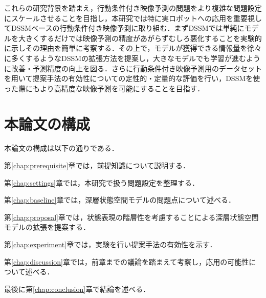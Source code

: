 これらの研究背景を踏まえ，行動条件付き映像予測の問題をより複雑な問題設定にスケールさせることを目指し，本研究では特に実ロボットへの応用を重要視してDSSMベースの行動条件付き映像予測に取り組む．まずDSSMでは単純にモデルを大きくするだけでは映像予測の精度があがらずむしろ悪化することを実験的に示しその理由を簡単に考察する．その上で，モデルが獲得できる情報量を徐々に多くするようなDSSMの拡張方法を提案し，大きなモデルでも学習が進むように改善・予測精度の向上を図る．さらに行動条件付き映像予測用のデータセットを用いて提案手法の有効性についての定性的・定量的な評価を行い，DSSMを使った際にもより高精度な映像予測を可能にすることを目指す．

\section{本論文の構成}

本論文の構成は以下の通りである．

第\ref{chap:prerequisite}章では，前提知識について説明する．

第\ref{chap:settings}章では，本研究で扱う問題設定を整理する．

第\ref{chap:baseline}章では，深層状態空間モデルの問題点について述べる．

第\ref{chap:proposal}章では，状態表現の階層性を考慮することによる深層状態空間モデルの拡張を提案する．

第\ref{chap:experiment}章では，実験を行い提案手法の有効性を示す．

第\ref{chap:discussion}章では，前章までの議論を踏まえて考察し，応用の可能性について述べる．

最後に第\ref{chap:conclusion}章で結論を述べる．